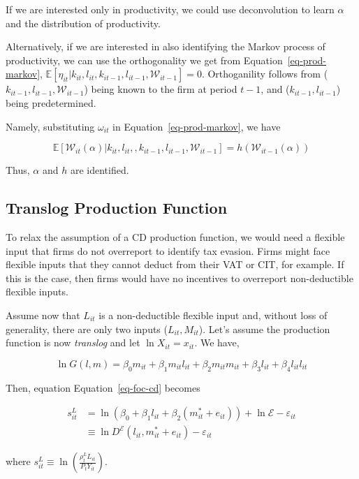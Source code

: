 \documentclass[
  12pt]{article}
\theoremstyle{definition}
\theoremstyle{remark}
\begin{document}
If we are interested only in productivity, we could use deconvolution to
learn \(\alpha\) and the distribution of productivity.

Alternatively, if we are interested in also identifying the Markov
process of productivity, we can use the orthogonality we get from
Equation~\ref{eq-prod-markov},
\(\mathbb{E}[\eta_{it}|k_{it},l_{it},k_{it-1},l_{it-1},\mathcal{W}_{it-1}]=0\).
Orthoganility follows from (\(k_{it-1},l_{it-1},\mathcal{W}_{it-1}\))
being known to the firm at period \(t-1\), and (\(k_{it-1},l_{it-1}\))
being predetermined.

Namely, substituting \(\omega_{it}\) in Equation~\ref{eq-prod-markov},
we have

\[
 \mathbb{E}[\mathcal{W}_{it}(\alpha)|k_{it},l_{it},,k_{it-1},l_{it-1},\mathcal{W}_{it-1}]=h(\mathcal{W}_{it-1}(\alpha))
\]

Thus, \(\alpha\) and \(h\) are identified.

\subsection{Translog Production
Function}\label{translog-production-function}

To relax the assumption of a CD production function, we would need a
flexible input that firms do not overreport to identify tax evasion.
Firms might face flexible inputs that they cannot deduct from their VAT
or CIT, for example. If this is the case, then firms would have no
incentives to overreport non-deductible flexible inputs.

Assume now that \(L_{it}\) is a non-deductible flexible input and,
without loss of generality, there are only two inputs
(\(L_{it}, M_{it}\)). Let's assume the production function is now
\emph{translog} and let \(\ln X_{it}=x_{it}\). We have,

\[
 \ln G(l,m)=\beta_0m_{it}+\beta_1m_{it}l_{it}+\beta_2m_{it}m_{it}+\beta_3l_{it}+\beta_4l_{it}l_{it}
\]

Then, equation Equation~\ref{eq-foc-cd} becomes

\[
\begin{aligned}
    s_{it}^{L}&=\ln \left(\beta_0+\beta_1l_{it}+\beta_2(m^*_{it}+e_{it})\right) + \ln \mathcal{E}- \varepsilon_{it} \\
    &\equiv \ln D^{\mathcal{E}}(l_{it},m^*_{it}+e_{it})- \varepsilon_{it} 
\end{aligned}
\]

where
\(s_{it}^{L} \equiv\ln\left(\frac{\rho^{L}_t L_{it}}{P_{t}Y_{it}}\right)\).
\end{document}
